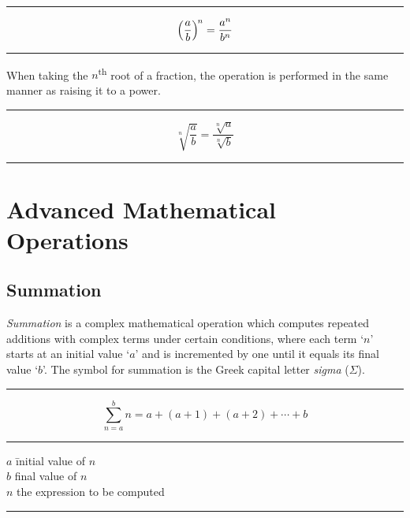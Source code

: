 \documentclass[a5paper,9pt]{book}
\theoremstyle{definition}
\newcommand{\eqlinesur}[1]{%
    \vspace*{\baselineskip}

    \hrule%

    \vspace*{\medskipamount}

    #1

    \vspace*{\medskipamount-0.5\belowdisplayskip}

    \hrule%

    \vspace*{\baselineskip}
}
\newcommand{\nomlinesur}[2]{%
    \vspace*{\baselineskip}

    \hrule%

    \vspace*{\medskipamount}

    #1

    \vspace*{\medskipamount}

    \hrule%

    \vspace*{\medskipamount}
    
    #2

    \vspace*{\medskipamount}

    \hrule

    \vspace*{\baselineskip}
}
\begin{document}
                \eqlinesur{%
                    \begin{equation*}
                        {\left(\frac{a}{b}\right)}^{\hspace{-1pt}n} = \frac{a^n}{b^n}
                    \end{equation*}
                }

                When taking the $n$\textsuperscript{th} root of a fraction, the operation
                is performed in the same manner as raising it to a power.

                \eqlinesur{%
                    \begin{equation*}
                        \sqrt[n]{\frac{a}{b}} = \frac{\sqrt[n]{a}}{\sqrt[n]{b}}
                    \end{equation*}
                }

                \pagebreak

            \section{Advanced Mathematical Operations}%
                \label{sec:advanced_mathematical_operations}

                \subsection{Summation}

                \emph{Summation} is a complex mathematical operation which computes repeated
                additions with complex terms under certain conditions, where each term
                `$n$' starts at an initial value `$a$' and is incremented by one until it 
                equals its final value `$b$'. The symbol for summation is the Greek capital
                letter \emph{sigma} ($\Sigma$).

                \nomlinesur{%
                    \begin{equation*}
                        \sum_{n=a}^{b} n = a + (a+1) + (a+2) + \cdots + b
                    \end{equation*}
                }{%
                    \begin{tabbing}
                        $a$ \hspace{25pt}\= initial value of $n$ \\
                        $b$ \> final value of $n$ \\
                        $n$ \> the expression to be computed
                    \end{tabbing}
                }
\end{document}

